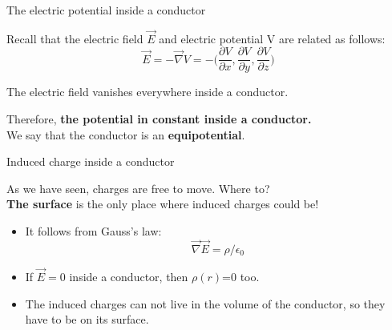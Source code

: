 \begin{frame}{The electric potential inside a conductor}

Recall that the electric field $\vec{E}$ and electric potential V are related as follows:
\begin{equation*}
  \vec{E} =
     - \vec{\nabla} V =
     - \Big(
          \frac{\partial V}{\partial x},
          \frac{\partial V}{\partial y},
          \frac{\partial V}{\partial z}
       \Big)
\end{equation*}

\vspace{0.3cm}

The electric field vanishes everywhere inside a conductor.\\
\vspace{0.3cm}

Therefore, {\textbf{the potential in constant inside a conductor.}}\\
\vspace{0.2cm}
We say that the conductor is an {\bf equipotential}.\\

\end{frame}

%
%
%

\begin{frame}{Induced charge inside a conductor}

As we have seen, charges are free to move. Where to?\\
\vspace{0.3cm}
{\bf The surface} is the only place where induced charges could be!
\begin{itemize}
  \item It follows from Gauss's law:
    \begin{equation*}
       \vec{\nabla} \vec{E} = {\rho}/\epsilon_0
    \end{equation*}
  \item If $\vec{E}=0$ inside a conductor, then $\rho(r)$=0 too.
  \item The induced charges can not live in the volume of the conductor, so they have to be on its surface.
\end{itemize}


\end{frame}


%
%
%


